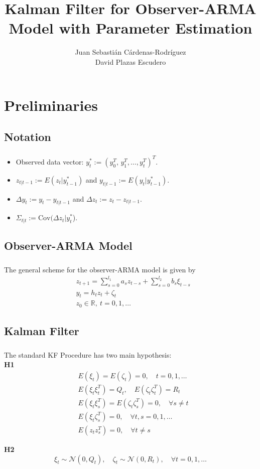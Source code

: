 \documentclass{beamer}
\title{Kalman Filter for Observer-ARMA Model with Parameter Estimation}
\author{Juan Sebasti\'an C\'ardenas-Rodríguez \\ David Plazas Escudero  \\ \vspace{0.5cm} \scalebox{0.7}{Mathematical Engineering, Universidad EAFIT}}
\theoremstyle{definition}
\theoremstyle{remark}
\theoremstyle{example}
\newif\ifinsection
\newif\ifinsubsection
\let\oldsection\section
\renewcommand{\section}{%
  \global\insectiontrue%
  \global\insubsectionfalse%
  \oldsection}
\let\oldsubsection\subsection
\renewcommand{\subsection}{%
  \global\insubsectiontrue%
  \oldsubsection}
\newcommand {\aframe}[1] {%
  \begin{frame}
    \ifinsection\frametitle{\secname}\fi
    \ifinsubsection\framesubtitle{\subsecname}\fi
  #1
  \end{frame}
}
\begin{document}
\begin{frame}[plain]
  \titlepage
\end{frame}

\section{Preliminaries}
\subsection{Notation}
\aframe{
\begin{itemize}
  \item Observed data vector: $y^*_t:=(y_0^T,\,y_1^T,\dots,y_t^T)^T$.
  \item $z_{t|t-1}:=E(z_t|y^*_{t-1})$ and $y_{t|t-1}:=E(y_t|y^*_{t-1})$.
  \item $\Delta y_t:=y_t-y_{t|t-1}$ and $\Delta z_t:=z_t-z_{t|t-1}$.
  \item $\Sigma_{t|t}:=\text{Cov}(\Delta z_t|y_t^*$).
\end{itemize}
}

\subsection{Observer-ARMA Model}
\aframe{
The general scheme for the observer-ARMA model is given by
\begin{equation}
  \begin{split}
    &z_{t+1}=\sum_{s=0}^{l_1}a_sz_{t-s}+\sum_{s=0}^{l_2}b_s\xi_{t-s}\\
    &y_t=h_tz_t+\zeta_t\\
    &z_0\in \mathbb{R}, \ t=0,1,\ldots
  \end{split}
\end{equation}
}

\subsection{Kalman Filter}
\aframe{
  The standard KF Procedure \parencite{kalman1960new} has two main hypothesis:\\
  \textbf{H1}
  \[
  \begin{split}
  &E(\xi_t)=E(\zeta_t)=0, \quad t=0,1,\ldots\\
  &E(\xi_t\xi_t^T)=Q_t, \quad E(\zeta_t\zeta_t^T)=R_t\\
  &E(\xi_t\xi_s^T)=E(\zeta_t\zeta_s^T)=0,\quad\forall s\neq t\\
  &E(\xi_t\zeta_s^T)=0, \quad \forall t,s=0,1,\ldots\\
  &E(z_tz_s^T)=0,\quad\forall t\neq s
  \end{split}
  \] \pause

  \textbf{H2}
  \[\xi_t\sim\mathcal{N}(0,Q_t),\quad\zeta_t\sim\mathcal{N}(0,R_t),\quad\forall t=0,1,\ldots\]
}
\end{document}
